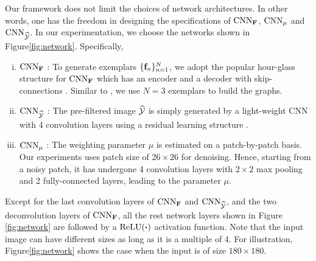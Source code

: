 \documentclass[10pt,twocolumn,letterpaper]{article}
\begin{document}
Our framework does not limit the choices of network architectures. 
In other words, one has the freedom in designing the specifications of ${\rm CNN}_{\bf F}$, ${\rm CNN}_{\mu}$ and ${\rm CNN}_{\widehat{\cal Y}}$. 
In our experimentation, we choose the networks shown in Figure\;\ref{fig:network}.
Specifically, 
%
\begin{enumerate}[(i)]
\item{${\rm CNN}_{\bf F}$} : 
To generate exemplars $\{{\bf f}_n\}_{n=1}^N$, we adopt the popular hour-glass structure for ${\rm CNN}_{\bf F}$ which has an encoder and a decoder with skip-connections \cite{ronneberger2015u}. 
Similar to \cite{pang2017graph}, we use $N=3$ exemplars to build the graphs.
%
\item{${\rm CNN}_{\widehat{\cal Y}}$} : The pre-filtered image $\widehat{\cal Y}$ is simply generated by a light-weight CNN with 4 convolution layers using a residual learning structure \cite{he16}.
%
\item{${\rm CNN}_{\mu}$} : The weighting parameter $\mu$ is estimated on a patch-by-patch basis. Our experiments uses patch size of $26 \times 26$ for denoising. Hence, starting from a noisy patch, it has undergone 4 convolution layers with $2\times 2$ max pooling and 2 fully-connected layers, leading to the parameter $\mu$.
\end{enumerate}
%
Except for the last convolution layers of ${\rm CNN}_{\bf F}$ and ${\rm CNN}_{\widehat{\cal Y}}$, and the two deconvolution layers of ${\rm CNN}_{\bf F}$, all the rest network layers shown in Figure\,\ref{fig:network} are followed by a ${\rm ReLU}(\bm\cdot)$ activation function. 
Note that the input image can have different sizes as long as it is a multiple of 4. 
For illustration, Figure\;\ref{fig:network} shows the case when the input is of size $180\times 180$.
\end{document}
